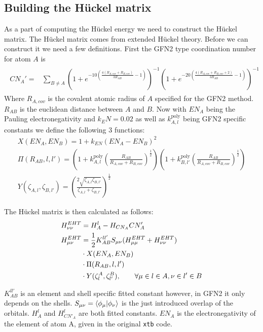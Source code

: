 \subsection{Building the Hückel matrix}
As a part of computing the Hückel energy we need to construct the Hückel matrix.
The Hückel matrix comes from extended Hückel theory. Before we can construct it we need a few definitions. 
First the GFN2 type coordination number for atom $A$ is
\begin{gather}
    \begin{split}
        CN_A' = &\sum_{B\neq A}\left(1+e^{-10\left(\frac{4\left(R_{A,cov}+R_{B,cov}\right)}{3R_{AB}}-1\right)}\right)^{-1}\left(1+e^{-20\left(\frac{4\left(R_{A,cov}+R_{B,cov}+2\right)}{3R_{AB}}-1\right)}\right)^{-1}
    \end{split}
\end{gather}
Where $R_{A,cov}$ is the covalent atomic radius of $A$ specified for the GFN2 method. $R_{AB}$ is the euclidean distance between $A$ and $B$.
Now with $EN_A$ being the Pauling electronegativity and $k_EN=0.02$ as well as $k_{A,l}^{\text{poly}}$ being GFN2 specific constants we define the following 3 functions:
\begin{gather}
    X(EN_A,EN_B) = 1 + k_{EN}(EN_A-EN_B)^2\\
    \Pi(R_{AB},l,l') = \left(1 + k^{\text{poly}}_{A,l}\left(\frac{R_{AB}}{R_{A,cov}+R_{B,cov}}\right)^\frac{1}{2}\right)\left(1 + k^{\text{poly}}_{B,l'}\left(\frac{R_{AB}}{R_{A,cov}+R_{B,cov}}\right)^\frac{1}{2}\right)\\
    Y(\zeta_{A,l},\zeta_{B,l'}) = \left(\frac{2\sqrt{\zeta_{A,l}\zeta_{B,l'}}}{\zeta_{A,l}+\zeta_{B,l'}}\right)^\frac{1}{2}
\end{gather}

The Hückel matrix is then calculated as follows:
\begin{align}
    H_{\nu\nu}^{EHT} &= H_A^l - H_{CN_A}CN_A'\\
    H^{EHT}_{\mu\nu} &= \frac{1}{2}K^{ll'}_{AB}S_{\mu\nu}(H^{EHT}_{\mu\mu}+H^{EHT}_{\nu\nu})\\
    &\cdot X(EN_A,EN_B)\notag\\
    &\cdot \Pi(R_{AB},l,l')\notag\\
    &\cdot Y(\zeta^A_l,\zeta^B_{l'}), \quad\quad \forall \mu \in l \in A, \nu \in l' \in B\notag
\end{align}

$K^{ll'}_{AB}$ is an element and shell specific fitted constant however, in GFN2 it only depends on the shells. 
$S_{\mu\nu}=\braket{\phi_\mu|\phi_\nu}$ is the just introduced overlap of the orbitals. 
$H^l_A$ and $H^l_{CN'_A}$ are both fitted constants. $EN_A$ is the electronegativity of the element of atom A, given in the original \texttt{xtb} code. 

